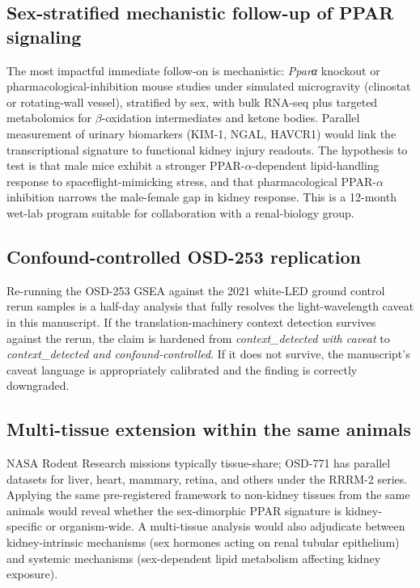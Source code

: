 \documentclass[11pt]{article}
\begin{document}
\subsection{Sex-stratified mechanistic follow-up of PPAR signaling}

The most impactful immediate follow-on is mechanistic: \emph{Pparα} knockout or pharmacological-inhibition mouse studies under simulated microgravity (clinostat or rotating-wall vessel), stratified by sex, with bulk RNA-seq plus targeted metabolomics for $\beta$-oxidation intermediates and ketone bodies. Parallel measurement of urinary biomarkers (KIM-1, NGAL, HAVCR1) would link the transcriptional signature to functional kidney injury readouts. The hypothesis to test is that male mice exhibit a stronger PPAR-$\alpha$-dependent lipid-handling response to spaceflight-mimicking stress, and that pharmacological PPAR-$\alpha$ inhibition narrows the male-female gap in kidney response. This is a 12-month wet-lab program suitable for collaboration with a renal-biology group.

\subsection{Confound-controlled OSD-253 replication}

Re-running the OSD-253 GSEA against the 2021 white-LED ground control rerun samples is a half-day analysis that fully resolves the light-wavelength caveat in this manuscript. If the translation-machinery context detection survives against the rerun, the claim is hardened from \emph{context\_detected with caveat} to \emph{context\_detected and confound-controlled}. If it does not survive, the manuscript's caveat language is appropriately calibrated and the finding is correctly downgraded.

\subsection{Multi-tissue extension within the same animals}

NASA Rodent Research missions typically tissue-share; OSD-771 has parallel datasets for liver, heart, mammary, retina, and others under the RRRM-2 series. Applying the same pre-registered framework to non-kidney tissues from the same animals would reveal whether the sex-dimorphic PPAR signature is kidney-specific or organism-wide. A multi-tissue analysis would also adjudicate between kidney-intrinsic mechanisms (sex hormones acting on renal tubular epithelium) and systemic mechanisms (sex-dependent lipid metabolism affecting kidney exposure).
\end{document}
